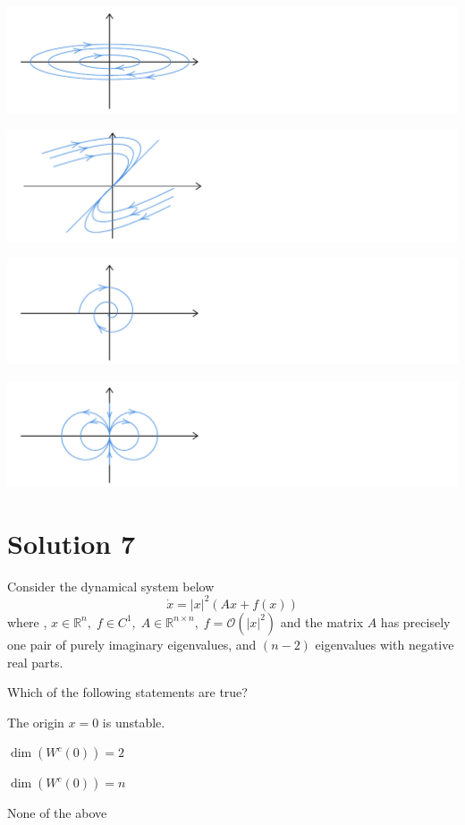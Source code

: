 \documentclass[twoside,10pt,a4paper]{article}
\begin{document}
\begin{enumerate}[label=(\alph*)]
	\item \includegraphics[scale=0.8]{Graphics/MCQ1_figures/Q17D01.pdf}
	\item \includegraphics[scale=0.8]{Graphics/MCQ1_figures/Q17D02.pdf}
	\item \includegraphics[scale=0.8]{Graphics/MCQ1_figures/Q17D03.pdf}
	{\color{MyRed}\item \includegraphics[scale=0.8]{Graphics/MCQ1_figures/Q17D04.pdf}}
\end{enumerate}

\section*{Solution 7}
Consider the dynamical system below
\begin{equation*}
	\dot{x} = |x|^2 (Ax + f(x))
\end{equation*}
where , $x \in \mathbb{R}^n, \; f \in C^1, \; A \in \mathbb{R}^{n \times n}, \; f = \mathcal{O}(|x|^2)$ and the matrix $A$ has precisely one pair of purely imaginary eigenvalues, and $(n - 2)$ eigenvalues with negative real parts.

Which of the following statements are true?

\begin{enumerate}[label=(\alph*)]
	\item The origin $x = 0$ is unstable.
	\item $ \dim(W^c(0)) = 2 $
	{\color{MyRed}\item$ \dim(W^c(0)) = n $}
	\item None of the above
\end{enumerate}
\end{document}
